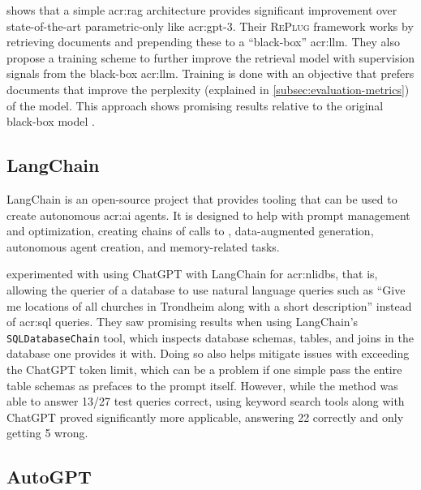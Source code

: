 \cite{shiREPLUGRetrievalAugmentedBlackBox2023} shows that a simple \gls{acr:rag} architecture provides significant improvement over state-of-the-art parametric-only  like \acrshort{acr:gpt}-3. Their \textsc{RePlug} framework works by retrieving documents and prepending these to a \enquote{black-box} \acrshort{acr:llm}. They also propose a training scheme to further improve the retrieval model with supervision signals from the black-box \acrshort{acr:llm}. Training is done with an objective that prefers documents that improve the perplexity (explained in \autoref{subsec:evaluation-metrics}) of the model. This approach shows promising results relative to the original black-box model \citep[5-6]{shiREPLUGRetrievalAugmentedBlackBox2023}.

\subsection{LangChain}\label{subsubsec:langchain}

LangChain \citep{chaseLangChain2022} is an open-source project that provides tooling that can be used to create autonomous \acrshort{acr:ai} agents. It is designed to help with prompt management and optimization, creating chains of calls to , data-augmented generation, autonomous agent creation, and memory-related tasks.

\cite{nascimentoFamilyNaturalLanguage2023} experimented with using ChatGPT with LangChain for \glspl{acr:nlidb}, that is, allowing the querier of a database to use natural language queries such as \enquote{Give me locations of all churches in Trondheim along with a short description} instead of \acrshort{acr:sql} queries. They saw promising results when using LangChain's \texttt{SQLDatabaseChain} tool, which inspects database schemas, tables, and joins in the database one provides it with. Doing so also helps mitigate issues with exceeding the ChatGPT token limit, which can be a problem if one simple pass the entire table schemas as prefaces to the prompt itself. However, while the method was able to answer 13/27 test queries correct, using keyword search tools along with ChatGPT proved significantly more applicable, answering 22 correctly and only getting 5 wrong.

\subsection{AutoGPT}\label{subsubsec:autogpt}

